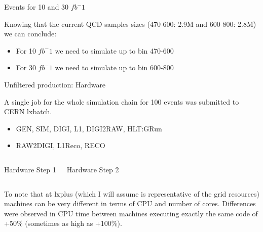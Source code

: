 \documentclass[8pt]{beamer}
\begin{document}
\begin{frame}{Events for 10 and 30 $fb^-1$}

\begin{block}



\end{block}
  
Knowing that the current QCD samples sizes (470-600: 2.9M and 600-800: 2.8M) we can conclude:
\begin{itemize}
  \item For 10 $fb^-1$ we need to simulate up to bin 470-600
  \item For 30 $fb^-1$ we need to simulate up to bin 600-800
\end{itemize}

\end{frame}


\begin{frame}{Unfiltered production: Hardware}

A single job for the whole simulation chain for 100 events was submitted to CERN lxbatch.
\begin{itemize}
  \item GEN, SIM, DIGI, L1, DIGI2RAW, HLT:GRun
  \item RAW2DIGI, L1Reco, RECO
\end{itemize}

\begin{columns}

  \centering
  
  \begin{block}{Hardware Step 1}
  
  \end{block}
  
  \centering
  
  \begin{block}{Hardware Step 2}
  
  \end{block}
  
\end{columns}


To note that at lxplus (which I will assume is representative of the grid resources) machines can be very different in terms of CPU and number of cores. Differences were observed in CPU time between machines executing exactly the same code of +50\% (sometimes as high as +100\%).

\end{frame}
\end{document}
